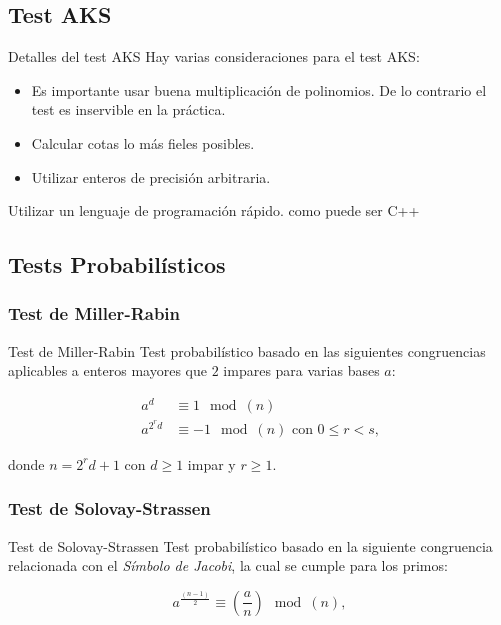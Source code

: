 \documentclass{beamer}
\begin{document}
\subsection{Test AKS}

\begin{frame}{Detalles del test AKS}
	\onslide<1->Hay varias consideraciones para el test AKS:
	
	\begin{itemize}
		\item Es importante usar buena multiplicación de polinomios. De lo contrario el test es inservible en la práctica.
		
		\item Calcular cotas lo más fieles posibles.
		
		\item Utilizar enteros de precisión arbitraria.
	\end{itemize}
	
	Utilizar un lenguaje de programación rápido. como puede ser C++
\end{frame}

\subsection{Tests Probabilísticos}

\subsubsection{Test de Miller-Rabin}

\begin{frame}{Test de Miller-Rabin}
	Test probabilístico basado en las siguientes congruencias aplicables a enteros mayores que $2$ impares para varias bases $a$:\break
	
	\begin{align}
	a^d &\equiv 1 \mod(n)\\
	a^{2^r d} &\equiv -1 \mod(n)\text{ con $0 \leq r < s$,}
	\end{align}
	
	donde $n = 2^rd + 1$ con $d \geq 1$ impar y $r \geq 1$.
\end{frame}

\subsubsection{Test de Solovay-Strassen}

\begin{frame}{Test de Solovay-Strassen}
	Test probabilístico basado en la siguiente congruencia relacionada con el \textit{Símbolo de Jacobi}, la cual se cumple para los primos:\break
	
	\begin{equation}
	a^{\frac{(n-1)}{2}} \equiv \left(\frac{a}{n}\right) \mod(n),
	\end{equation}
\end{frame}
\end{document}
